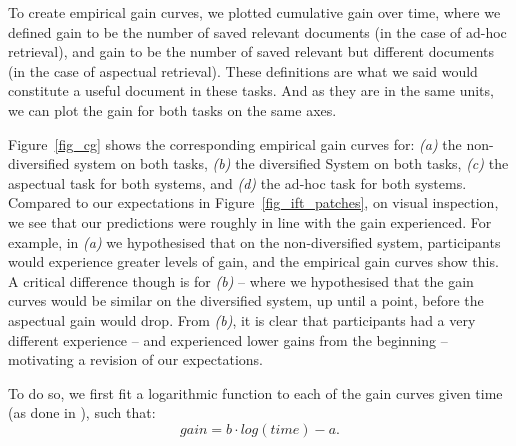 To create empirical gain curves, we plotted cumulative gain over time, where we defined gain to be the number of saved relevant documents (in the case of ad-hoc retrieval), and gain to be the number of saved relevant but different documents (in the case of aspectual retrieval). These definitions are what we said would constitute a useful document in these tasks. And as they are in the same units, we can plot the gain for both tasks on the same axes.

Figure~\ref{fig_cg} shows the corresponding empirical gain curves for: \textit{(a)} the non-diversified system on both tasks, \textit{(b)} the diversified System on both tasks, \textit{(c)} the aspectual task for both systems, and \textit{(d)} the ad-hoc task for both systems. Compared to our expectations in Figure~\ref{fig_ift_patches}, on visual inspection, we see that our predictions were roughly in line with the gain experienced. For example, in \textit{(a)} we hypothesised that on the non-diversified system, participants would experience greater levels of gain, and the empirical gain curves show this. A critical difference though is for \textit{(b)} -- where we hypothesised that the gain curves would be similar on the diversified system, up until a point, before the aspectual gain would drop. From \textit{(b)}, it is clear that participants had a very different experience -- and experienced lower gains from the beginning -- motivating a revision of our expectations.

To do so, we first fit a logarithmic function to each of the gain curves given time (as done in \cite{ath2014ift}), such that:
\begin{equation}
gain = b \cdot log(time) - a.
\end{equation}

